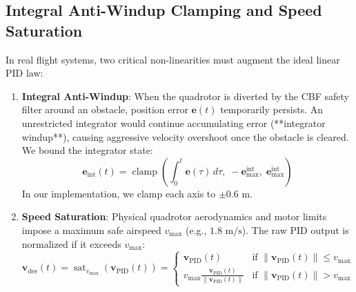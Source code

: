 \documentclass[11pt,a4paper]{article}
\begin{document}
\subsection{Integral Anti-Windup Clamping and Speed Saturation}
In real flight systems, two critical non-linearities must augment the ideal linear PID law:
\begin{enumerate}
    \item \textbf{Integral Anti-Windup}: When the quadrotor is diverted by the CBF safety filter around an obstacle, position error $\mathbf{e}(t)$ temporarily persists. An unrestricted integrator would continue accumulating error (**integrator windup**), causing aggressive velocity overshoot once the obstacle is cleared. We bound the integrator state:
    \begin{equation}
    \mathbf{e}_{\mathrm{int}}(t) = \operatorname{clamp}\left( \int_{0}^{t} \mathbf{e}(\tau) \, d\tau, \; -\mathbf{e}_{\max}^{\mathrm{int}}, \; \mathbf{e}_{\max}^{\mathrm{int}} \right)
    \end{equation}
    In our implementation, we clamp each axis to $\pm 0.6\text{ m}$.
    
    \item \textbf{Speed Saturation}: Physical quadrotor aerodynamics and motor limits impose a maximum safe airspeed $v_{\max}$ (e.g., $1.8\text{ m/s}$). The raw PID output is normalized if it exceeds $v_{\max}$:
    \begin{equation}
    \mathbf{v}_{\mathrm{des}}(t) = \operatorname{sat}_{v_{\max}}(\mathbf{v}_{\mathrm{PID}}(t)) = 
    \begin{cases}
    \mathbf{v}_{\mathrm{PID}}(t) & \text{if } \|\mathbf{v}_{\mathrm{PID}}(t)\| \le v_{\max} \\
    v_{\max} \frac{\mathbf{v}_{\mathrm{PID}}(t)}{\|\mathbf{v}_{\mathrm{PID}}(t)\|} & \text{if } \|\mathbf{v}_{\mathrm{PID}}(t)\| > v_{\max}
    \end{cases}
    \label{eq:v_des_saturated}
    \end{equation}
\end{enumerate}
\end{document}
